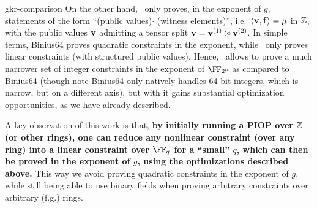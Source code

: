 \begin{lncsappendix}{gkr-comparison}
        On the other hand, \ftwoz \ only proves, in the exponent of $g$, statements of the form ``(public values)$\cdot$ (witness elements)'', i.e.\ $\langle \mathbf{v}, \mathbf{f}\rangle = \mu$ in $\mathbb{Z}$, with the public values $\mathbf{v}$ admitting a tensor split $\mathbf{v}=\mathbf{v}^{(1)} \otimes \mathbf{v}^{(2)}$. In simple terms, Binius64 proves quadratic constraints in the exponent, while \ftwoz\ only proves linear constraints (with structured public values). Hence, \ftwoz\ allows to prove a much narrower set of integer constraints in the exponent of $\comfield$ as compared to Binius64 (though note Binius64 only natively handles 64-bit integers, which is narrow, but on a different axis), but with it gains substantial optimization opportunities, as we have already described. 
        
        A key observation of this work is that, \textbf{by initially running a PIOP over $\mathbb{Z}$ (or other rings), one can reduce any nonlinear constraint (over any ring) into a linear constraint over $\FF_q$ for a ``small'' $q$, which can then be proved in the exponent of $g$, using the optimizations described above.} This way we avoid  proving quadratic constraints in the exponent of $g$, while still being able to use binary fields when proving arbitrary constraints over arbitrary (f.g.) rings.

\end{lncsappendix}
